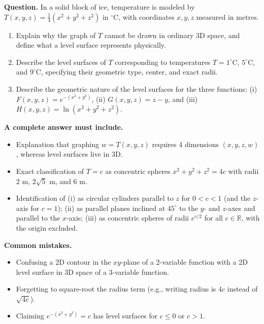 \documentclass[11pt,letterpaper]{article}
\newcommand{\R}{\mathbb{R}}
\begin{document}
\textbf{Question.} 
In a solid block of ice, temperature is modeled by $T(x,y,z) = \frac{1}{4}(x^2 + y^2 + z^2)$ in $^\circ\text{C}$, with coordinates $x,y,z$ measured in metres.
\begin{enumerate}[label=(\alph*),nosep]
    \item Explain why the graph of $T$ cannot be drawn in ordinary 3D space, and define what a level surface represents physically.
    \item Describe the level surfaces of $T$ corresponding to temperatures $T = 1^\circ\text{C}$, $5^\circ\text{C}$, and $9^\circ\text{C}$, specifying their geometric type, center, and exact radii.
    \item Describe the geometric nature of the level surfaces for the three functions:
    (i) $F(x,y,z) = e^{-(x^2+y^2)}$, (ii) $G(x,y,z) = z - y$, and (iii) $H(x,y,z) = \ln(x^2+y^2+z^2)$.
\end{enumerate}

\textbf{A complete answer must include.}
\begin{itemize}[leftmargin=*,nosep]
    \item Explanation that graphing $w=T(x,y,z)$ requires 4 dimensions $(x,y,z,w)$, whereas level surfaces live in 3D.
    \item Exact classification of $T=c$ as concentric spheres $x^2+y^2+z^2 = 4c$ with radii $2$ m, $2\sqrt{5}$ m, and $6$ m.
    \item Identification of (i) as circular cylinders parallel to $z$ for $0<c<1$ (and the $z$-axis for $c=1$); (ii) as parallel planes inclined at $45^\circ$ to the $y$- and $z$-axes and parallel to the $x$-axis; (iii) as concentric spheres of radii $e^{c/2}$ for all $c \in \R$, with the origin excluded.
\end{itemize}

\textbf{Common mistakes.}
\begin{itemize}[leftmargin=*,nosep]
    \item Confusing a 2D contour in the $xy$-plane of a 2-variable function with a 2D level surface in 3D space of a 3-variable function.
    \item Forgetting to square-root the radius term (e.g., writing radius is $4c$ instead of $\sqrt{4c}$).
    \item Claiming $e^{-(x^2+y^2)} = c$ has level surfaces for $c \le 0$ or $c > 1$.
\end{itemize}
\end{document}
